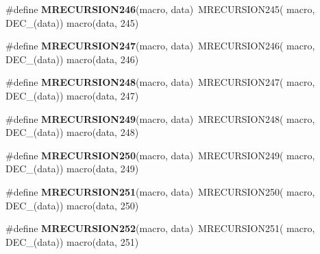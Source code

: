 \begin{DoxyCompactItemize}
\item 
\hypertarget{group__group__sam0__utils__mrecursion_ga25546469a624b95c6a35ac8afc6f8639}{}\#define {\bfseries M\+R\+E\+C\+U\+R\+S\+I\+O\+N246}(macro,  data)~M\+R\+E\+C\+U\+R\+S\+I\+O\+N245(  macro, D\+E\+C\+\_\+(data))   macro(data, 245)\label{group__group__sam0__utils__mrecursion_ga25546469a624b95c6a35ac8afc6f8639}

\item 
\hypertarget{group__group__sam0__utils__mrecursion_gabf0b381254bd692cd7d2a3099bb3b9c0}{}\#define {\bfseries M\+R\+E\+C\+U\+R\+S\+I\+O\+N247}(macro,  data)~M\+R\+E\+C\+U\+R\+S\+I\+O\+N246(  macro, D\+E\+C\+\_\+(data))   macro(data, 246)\label{group__group__sam0__utils__mrecursion_gabf0b381254bd692cd7d2a3099bb3b9c0}

\item 
\hypertarget{group__group__sam0__utils__mrecursion_ga769f51d1e1ee63f851004b0b7754e9c1}{}\#define {\bfseries M\+R\+E\+C\+U\+R\+S\+I\+O\+N248}(macro,  data)~M\+R\+E\+C\+U\+R\+S\+I\+O\+N247(  macro, D\+E\+C\+\_\+(data))   macro(data, 247)\label{group__group__sam0__utils__mrecursion_ga769f51d1e1ee63f851004b0b7754e9c1}

\item 
\hypertarget{group__group__sam0__utils__mrecursion_ga88378c5ef3f59f0a70241fe6f4c35673}{}\#define {\bfseries M\+R\+E\+C\+U\+R\+S\+I\+O\+N249}(macro,  data)~M\+R\+E\+C\+U\+R\+S\+I\+O\+N248(  macro, D\+E\+C\+\_\+(data))   macro(data, 248)\label{group__group__sam0__utils__mrecursion_ga88378c5ef3f59f0a70241fe6f4c35673}

\item 
\hypertarget{group__group__sam0__utils__mrecursion_gabf6d964d9a876f23c5d7269c10bb4d08}{}\#define {\bfseries M\+R\+E\+C\+U\+R\+S\+I\+O\+N250}(macro,  data)~M\+R\+E\+C\+U\+R\+S\+I\+O\+N249(  macro, D\+E\+C\+\_\+(data))   macro(data, 249)\label{group__group__sam0__utils__mrecursion_gabf6d964d9a876f23c5d7269c10bb4d08}

\item 
\hypertarget{group__group__sam0__utils__mrecursion_ga41dbf786afa14bfc12394ead27564bea}{}\#define {\bfseries M\+R\+E\+C\+U\+R\+S\+I\+O\+N251}(macro,  data)~M\+R\+E\+C\+U\+R\+S\+I\+O\+N250(  macro, D\+E\+C\+\_\+(data))   macro(data, 250)\label{group__group__sam0__utils__mrecursion_ga41dbf786afa14bfc12394ead27564bea}

\item 
\hypertarget{group__group__sam0__utils__mrecursion_ga6ed69ac45fac97d823737b0b9eb1f0b9}{}\#define {\bfseries M\+R\+E\+C\+U\+R\+S\+I\+O\+N252}(macro,  data)~M\+R\+E\+C\+U\+R\+S\+I\+O\+N251(  macro, D\+E\+C\+\_\+(data))   macro(data, 251)\label{group__group__sam0__utils__mrecursion_ga6ed69ac45fac97d823737b0b9eb1f0b9}


\end{DoxyCompactItemize}
